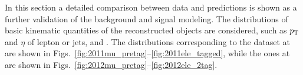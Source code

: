 In this section a detailed comparison between data and predictions is
shown as a further validation of the background and signal modeling. The
distributions of basic kinematic quantities of the reconstructed
objects are considered, such as $p_{\mathrm{T}}{}$ and $\eta$ of lepton or jets,
\met{} and \mtw{}. The distributions corresponding to the dataset at
\seventev{} are shown in
Figs.~\ref{fig:2011mu_pretag}--\ref{fig:2011ele_tagged}, while the ones
at \eighttev{} are shown in
Figs.~\ref{fig:2012mu_pretag}--\ref{fig:2012ele_2tag}. 

